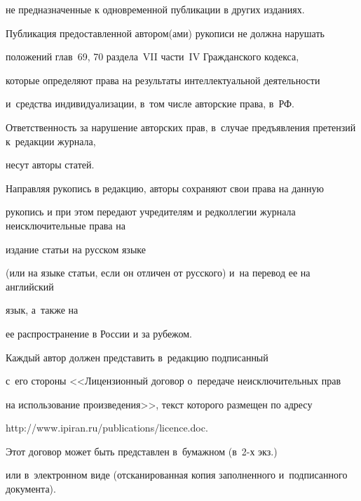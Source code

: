 {\begin{enumerate}[1.]
не предназначенные к одновременной публикации в других изданиях.







Публикация предоставленной автором(ами) рукописи не должна нарушать 


положений глав~69, 70 раздела~VII части~IV Гражданского кодекса, 


которые определяют права на результаты интеллектуальной деятельности 


и~средства индивидуализации, в~том числе авторские права, в~РФ.





Ответственность за нарушение авторских прав, в~случае предъявления претензий к~редакции журнала,  


несут авторы статей.











Направляя рукопись в редакцию, авторы сохраняют свои права на данную


рукопись и при этом передают учредителям и редколлегии журнала неисключительные права на


издание статьи на русском языке 


(или на языке статьи, если он отличен от рус\-ско\-го) и~на перевод ее на английский


язык, а~также на


ее распространение в России и за рубежом. 


Каждый автор должен представить в~редакцию подписанный 


с~его стороны <<Лицензионный договор о~передаче неисключительных прав 


на использование произведения>>, текст которого размещен по адресу 


{\sf http://www.ipiran.ru/publications/licence.doc}. 


Этот договор может быть пред\-став\-лен в~бумажном (в~2-х экз.)\ 


или в~электронном виде (отсканированная копия заполненного и~подписанного документа).















\end{enumerate}}
